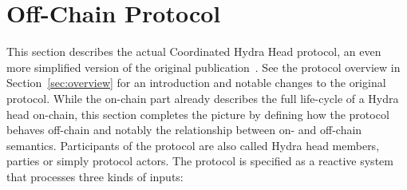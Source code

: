 \section{Off-Chain Protocol}\label{sec:offchain}

This section describes the actual Coordinated Hydra Head protocol, an even more
simplified version of the original publication~\cite{hydrahead20}. See the
protocol overview in Section~\ref{sec:overview} for an introduction and notable
changes to the original protocol. While the on-chain part already describes the
full life-cycle of a Hydra head on-chain, this section completes the picture by
defining how the protocol behaves off-chain and notably the relationship between
on- and off-chain semantics. Participants of the protocol are also called Hydra
head members, parties or simply protocol actors. The protocol is specified as a
reactive system that processes three kinds of inputs:
